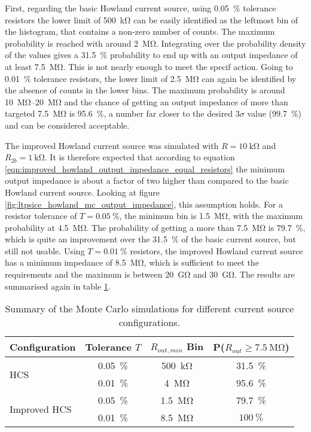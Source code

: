 First, regarding the basic Howland current source, using \qty{0.05}{\percent} tolerance resistors the lower limit of \qty{500}{\kilo\ohm} can be easily identified as the leftmost bin of the histogram, that contains a non-zero number of counts. The maximum probability is reached with around \qty{2}{\mega\ohm}. Integrating over the probability density of the values gives a \qty{31.5}{\percent} probability to end up with an output impedance of at least \qty{7.5}{\mega\ohm}. This is not nearly enough to meet the specif action. Going to \qty{0.01}{\percent} tolerance resistors, the lower limit of \qty{2.5}{\mega\ohm} can again be identified by the absence of counts in the lower bins. The maximum probability is around \qtyrange{10}{20}{\mega\ohm} and the chance of getting an output impedance of more than targeted \qty{7.5}{\mega\ohm} is \qty{95.6}{\percent}, a number far closer to the desired $3\sigma$ value (\qty{99.7}{\percent}) and can be considered acceptable.

The improved Howland current source was simulated with $R=\qty{10}{\kilo\ohm}$ and $R_{2b} = \qty{1}{\kilo\ohm}$. It is therefore expected that according to equation \ref{eqn:improved_howland_output_impedance_equal_resistors} the minimum output impedance is about a factor of two higher than compared to the basic Howland current source. Looking at figure \ref{fig:ltpsice_howland_mc_output_impedance}, this assumption holds. For a resistor tolerance of $T=\qty{0.05}{\percent}$, the minimum bin is \qty{1.5}{\mega\ohm}, with the maximum probability at \qty{4.5}{\mega\ohm}. The probability of getting a more than \qty{7.5}{\mega\ohm} is \qty{79.7}{\percent}, which is quite an improvement over the \qty{31.5}{\percent} of the basic current source, but still not usable. Using $T=\qty{0.01}{\percent}$ resistors, the improved Howland current source has a minimum impedance of \qty{8.5}{\mega\ohm}, which is sufficient to meet the requirements and the maximum is between \qty{20}{\giga\ohm} and \qty{30}{\giga\ohm}. The results are summarised again in table \ref{tab:howland_current_source_summary}.
\begin{table}[hb]
    \centering
    \begin{tabular}{lccc}
        \toprule
        Configuration& Tolerance $T$ & $R_{out, min}$ Bin& P($R_{out} \geq \qty{7.5}{\mega\ohm}$) \\
        \midrule
        \multirow{2}{*}{HCS} & \qty{0.05}{\percent}& \qty{500}{\kilo\ohm}& \qty{31.5}{\percent}\\
        & \qty{0.01}{\percent} & \qty{4}{\mega\ohm}& \qty{95.6}{\percent} \\
        \multirow{2}{*}{Improved HCS} & \qty{0.05}{\percent}& \qty{1.5}{\mega\ohm}& \qty{79.7}{\percent} \\
        & \qty{0.01}{\percent}& \qty{8.5}{\mega\ohm}& $\qty{100}{\percent}$\\
        \bottomrule
    \end{tabular}
    \caption{Summary of the Monte Carlo simulations for different current source configurations.}
    \label{tab:howland_current_source_summary}
\end{table}

